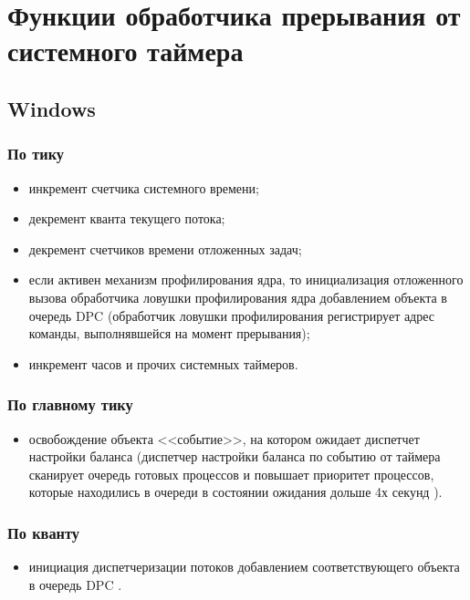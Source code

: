 \documentclass[a4paper,oneside,14pt]{extarticle}
\begin{document}

\setcounter{page}{2}
\renewcommand{\contentsname}{СОДЕРЖАНИЕ}
\tableofcontents

\newpage

\section{Функции обработчика прерывания от системного таймера}

\subsection{Windows}

\subsubsection{По тику}
\begin{itemize}
	\item инкремент счетчика системного времени;
	\item декремент кванта текущего потока;
	\item декремент счетчиков времени отложенных задач;
    \item если активен механизм профилирования ядра, то инициализация отложенного вызова обработчика ловушки профилирования ядра добавлением объекта в очередь DPC (обработчик ловушки профилирования регистрирует адрес команды, выполнявшейся на момент прерывания);
	\item инкремент часов и прочих системных таймеров.
\end{itemize}

\subsubsection{По главному тику}
\begin{itemize}
    \item освобождение объекта <<событие>>, на котором ожидает диспетчет настройки баланса (диспетчер настройки баланса по событию от таймера сканирует очередь готовых процессов и повышает приоритет процессов, которые находились в очереди в состоянии ожидания дольше 4х секунд \cite[с.~511]{windows}).
\end{itemize}

\subsubsection{По кванту}
\begin{itemize}
    \item инициация диспетчеризации потоков добавлением соответствующего объекта в очередь DPC \cite[c.~146]{windows}.
\end{itemize}
\end{document}

